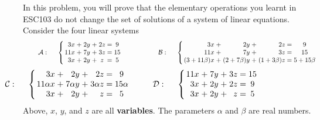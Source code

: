 \documentclass[10pt,addpoints,answers]{exam}
\begin{document}
\begin{questions}
  \question In this problem, you will prove that the elementary operations you
  learnt in ESC103 do not change the set of solutions of a system of linear
  equations.  Consider the four linear systems
$$
\hspace{.8cm} \mathcal{A}: \hspace{.5cm} \left\{ \arraycolsep=1.4pt
	\begin{array}{rcrrcrcr}
          3x &+&2y &+&2z &= &9\\
          11x &+&7y &+&3z &=& 15\\
          3x &+&2y &+&z &=& 5
	\end{array} \right.
      \hspace{1.9cm}
      \mathcal{B}: \hspace{.5cm} \left\{
        \arraycolsep=1.4pt
	\begin{array}{rcrcrccr}
          3x &+&2y &+&2z &= &9\\
          11x &+&7y &+&3z &=& 15\\
          (3 + 11 \beta) x &+&(2+7 \beta) y &+&(1+3 \beta) z &=& 5 + 15 \beta
	\end{array} \right.
$$
$$
\hspace{-3.3cm} \mathcal{C}: \hspace{.5cm} \left\{ \arraycolsep=1.4pt
	\begin{array}{rcrcrccr}
          3x &+&2y &+&2z &= &9\\
          11 \alpha x &+&7 \alpha y &+&3 \alpha z &=& 15 \alpha\\
          3x &+&2y &+&z &=& 5
	\end{array} \right.
      \hspace{.9cm}
      \mathcal{D}: \hspace{.5cm} \left\{
        \arraycolsep=1.4pt
	\begin{array}{rcrcrccr}
          11x &+&7y &+&3z &=& 15\\
          3x &+&2y &+&2z &= &9\\
          3x &+&2y &+&z &=& 5
	\end{array} \right.
$$
Above, $x$, $y$, and $z$ are all \textbf{variables}.  The parameters $\alpha$
and $\beta$ are real numbers.


\end{questions}
\end{document}

